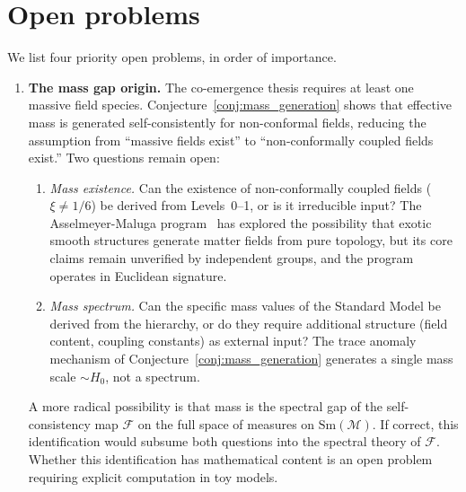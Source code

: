 \documentclass[12pt,a4paper]{article}
\theoremstyle{definition}
\theoremstyle{remark}
\begin{document}
\section{Open problems}
\label{sec:open}

We list four priority open problems, in order of importance.

\begin{enumerate}

\item \textbf{The mass gap origin.}
The co-emergence thesis requires at least one massive field species.
Conjecture~\ref{conj:mass_generation} shows that effective mass is
generated self-consistently for non-conformal fields, reducing the
assumption from ``massive fields exist'' to ``non-conformally coupled
fields exist.'' Two questions remain open:
\begin{enumerate}
\item[(a)] \emph{Mass existence.} Can the existence of non-conformally
coupled fields ($\xi \neq 1/6$) be derived from Levels~0--1, or is it
irreducible input? The Asselmeyer-Maluga
program~\cite{asselmeyer_maluga} has explored the possibility that
exotic smooth structures generate matter fields from pure topology, but
its core claims remain unverified by independent groups, and the
program operates in Euclidean signature.
\item[(b)] \emph{Mass spectrum.} Can the specific mass values of the
Standard Model be derived from the hierarchy, or do they require
additional structure (field content, coupling constants) as external
input? The trace anomaly mechanism of
Conjecture~\ref{conj:mass_generation} generates a single mass scale
$\sim H_0$, not a spectrum.
\end{enumerate}
A more radical possibility is that mass is the spectral gap of the
self-consistency map $\mathcal{F}$ on the full space of measures on
$\mathrm{Sm}(\mathcal{M})$. If correct, this identification would
subsume both questions into the spectral theory of $\mathcal{F}$. Whether
this identification has mathematical content is an open problem
requiring explicit computation in toy models.


\end{enumerate}
\end{document}
